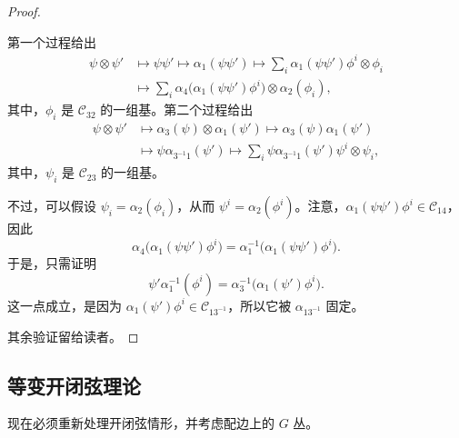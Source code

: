 \begin{proof}
\begin{figure}[H]
\centering
{}
\BookNumberOnlyCaption\label{fig:2.47}
\end{figure}

第一个过程给出
\[
\begin{aligned}
\psi\otimes\psi'&\longmapsto\psi\psi'
\longmapsto\alpha_1(\psi\psi')
\longmapsto\sum_i\alpha_1(\psi\psi')\phi^i\otimes\phi_i\\
&\longmapsto\sum_i\alpha_4\bigl(\alpha_1(\psi\psi')\phi^i\bigr)\otimes\alpha_2(\phi_i),
\end{aligned}
\]
其中，$\phi_i$ 是 $\mathcal{C}_{32}$ 的一组基。第二个过程给出
\[
\begin{aligned}
\psi\otimes\psi'&\longmapsto\alpha_3(\psi)\otimes\alpha_1(\psi')
\longmapsto\alpha_3(\psi)\alpha_1(\psi')\\
&\longmapsto\psi\alpha_{3^{-1}1}(\psi')
\longmapsto\sum_i\psi\alpha_{3^{-1}1}(\psi')\psi^i\otimes\psi_i,
\end{aligned}
\]
其中，$\psi_i$ 是 $\mathcal{C}_{23}$ 的一组基。

不过，可以假设 $\psi_i=\alpha_2(\phi_i)$，从而 $\psi^i=\alpha_2(\phi^i)$。注意，$\alpha_1(\psi\psi')\phi^i\in\mathcal{C}_{14}$，因此
\[
\alpha_4\bigl(\alpha_1(\psi\psi')\phi^i\bigr)
=\alpha_1^{-1}\bigl(\alpha_1(\psi\psi')\phi^i\bigr).
\]
于是，只需证明
\[
\psi'\alpha_1^{-1}(\phi^i)
=\alpha_3^{-1}\bigl(\alpha_1(\psi')\phi^i\bigr).
\]
这一点成立，是因为 $\alpha_1(\psi')\phi^i\in\mathcal{C}_{13^{-1}}$，所以它被 $\alpha_{13^{-1}}$ 固定。

其余验证留给读者。
\end{proof}

\subsection{等变开闭弦理论}\label{sec:2.7.4}

现在必须重新处理开闭弦情形，并考虑配边上的 $G$ 丛。

